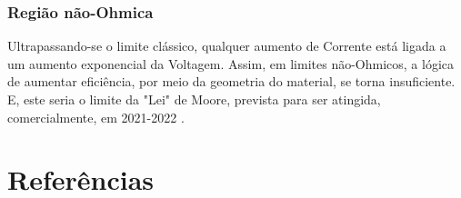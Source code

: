 \documentclass[11pt]{article}
\begin{document}
\subsubsection{Região não-Ohmica}
\label{sec:org251ff4b}
Ultrapassando-se o limite clássico, qualquer aumento de Corrente está ligada a um aumento exponencial da Voltagem. Assim, em limites não-Ohmicos, a lógica de aumentar eficiência, por meio da geometria do material, se torna insuficiente. E, este seria o limite da  "Lei" de Moore, prevista para ser atingida, comercialmente, em 2021-2022 \cite{forrest_2016}.

\section{Referências}

\end{document}

